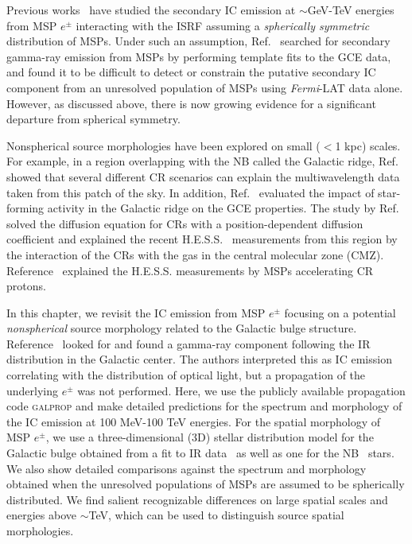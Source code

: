 \documentclass[doublespace,nopageskip]{VTthesis} %
\begin{document}
Previous works~\cite{Yuan:2014yda,Petrovic:2014xra} have studied the secondary IC emission at $\sim$GeV-TeV energies from MSP $e^\pm$ interacting with the ISRF assuming a \emph{spherically symmetric} distribution of MSPs. Under such an assumption, Ref.~\cite{Lacroix:2015wfx} searched for secondary gamma-ray emission from MSPs by performing template fits to the GCE data, and found it to be difficult to detect or constrain the putative secondary IC component from an unresolved population of MSPs using \textit{Fermi}-LAT data alone. However, as discussed above, there is now growing evidence for a significant departure from spherical symmetry.

Nonspherical source morphologies have been explored on small ($<$1 kpc) scales. For example, in a region overlapping with the NB called the Galactic ridge, Ref.~\cite{Macias:2014sta} showed that several different CR scenarios can explain the multiwavelength data taken from this patch of the sky. In addition, Ref.~\cite{Carlson:2015ona} evaluated the impact of star-forming activity in the Galactic ridge on the GCE properties. The study by Ref.~\cite{Gaggero:2017jts} solved the diffusion equation for CRs with a position-dependent diffusion coefficient and explained the recent H.E.S.S.~\cite{Abramowski:2016mir} measurements from this region by the interaction of the CRs with the gas in the central molecular zone (CMZ). Reference~\cite{Guepin:2018jkb} explained the H.E.S.S. measurements by MSPs accelerating CR protons.

In this chapter, we revisit the IC emission from MSP $e^\pm$ focusing on a potential \emph{nonspherical} source morphology related to the Galactic bulge structure. Reference~\cite{Abazajian:2014hsa} looked for and found a gamma-ray component following the IR distribution in the Galactic center. The authors interpreted this as IC emission correlating with the distribution of optical light, but a propagation of the underlying $e^\pm$ was not performed. Here, we use the publicly available propagation code \textsc{galprop}\cite{Strong:1998fr,Galprop,Galpropsupplementary} and make detailed predictions for the spectrum and morphology of the IC emission at 100 MeV-100 TeV energies. For the spatial morphology of MSP $e^\pm$, we use a three-dimensional (3D) stellar distribution model for the Galactic bulge obtained from a fit to IR data~\cite{Freudenreich:1997bx} as well as one for the NB~\cite{Launhardt:2002tx} stars. We also show detailed comparisons against the spectrum and morphology obtained when the unresolved populations of MSPs are assumed to be spherically distributed. We find salient recognizable differences on large spatial scales and energies above $\sim$TeV, which can be used to distinguish source spatial morphologies.
\end{document}
